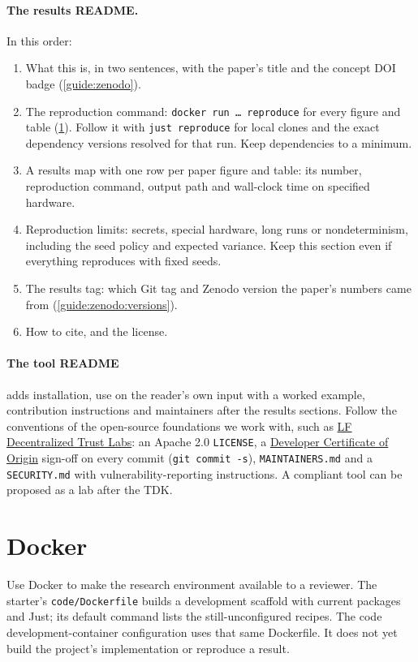 \paragraph{The results README.} In this order:
\begin{enumerate}[noitemsep]
  \item What this is, in two sentences, with the paper's title and the concept DOI badge (\cref{guide:zenodo}).
  \item The reproduction command: \texttt{docker run \dots{} reproduce} for every figure and table (\cref{guide:code:docker}). Follow it with \texttt{just reproduce} for local clones and the exact dependency versions resolved for that run. Keep dependencies to a minimum.
  \item A results map with one row per paper figure and table: its number, reproduction command, output path and wall-clock time on specified hardware.
  \item Reproduction limits: secrets, special hardware, long runs or nondeterminism, including the seed policy and expected variance. Keep this section even if everything reproduces with fixed seeds.
  \item The results tag: which Git tag and Zenodo version the paper's numbers came from (\cref{guide:zenodo:versions}).
  \item How to cite, and the license.
\end{enumerate}

\paragraph{The tool README} adds installation, use on the reader's own input with a worked example, contribution instructions and maintainers after the results sections. Follow the conventions of the open-source foundations we work with, such as \href{https://github.com/LF-Decentralized-Trust/lab-proposals/blob/main/README.md}{LF Decentralized Trust Labs}: an Apache 2.0 \texttt{LICENSE}, a \href{https://developercertificate.org/}{Developer Certificate of Origin} sign-off on every commit (\texttt{git commit -s}), \texttt{MAINTAINERS.md} and a \texttt{SECURITY.md} with vulnerability-reporting instructions. A compliant tool can be proposed as a lab after the TDK.

\section{Docker}\label{guide:code:docker}
Use Docker to make the research environment available to a reviewer. The starter's \texttt{code/Dockerfile} builds a development scaffold with current packages and Just; its default command lists the still-unconfigured recipes. The code development-container configuration uses that same Dockerfile. It does not yet build the project's implementation or reproduce a result.

